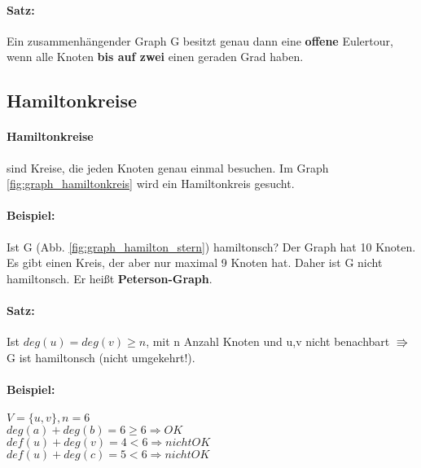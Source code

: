 \paragraph{Satz:} Ein zusammenhängender Graph G besitzt genau dann eine \textbf{offene} Eulertour, wenn alle Knoten \textbf{bis auf zwei} einen geraden Grad haben. 




\subsection{Hamiltonkreise}

\paragraph{Hamiltonkreise} sind Kreise, die jeden Knoten genau einmal besuchen. Im Graph \ref{fig:graph_hamiltonkreis} wird ein Hamiltonkreis gesucht. 




\paragraph{Beispiel:} Ist G (Abb. \ref{fig:graph_hamilton_stern}) hamiltonsch? Der Graph hat 10 Knoten. Es gibt einen Kreis, der aber nur maximal 9 Knoten hat. Daher ist G nicht hamiltonsch. Er heißt \textbf{Peterson-Graph}.




\paragraph{Satz:} Ist $deg(u) = deg(v) \geq n $, mit n Anzahl Knoten und u,v nicht benachbart $\Rrightarrow$ G ist hamiltonsch (nicht umgekehrt!).

\paragraph{Beispiel:} $V=\{u,v\}, n=6$\\
$deg(a)+deg(b)=6 \geq 6 \Rightarrow OK$\\
$def(u)+deg(v)=4 < 6 \Rightarrow nicht OK$\\
$def(u)+deg(c)=5 < 6 \Rightarrow nicht OK$\\


